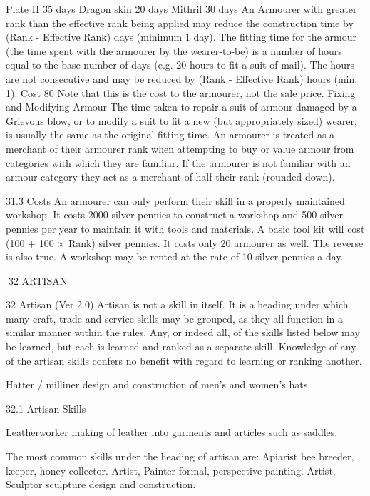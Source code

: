 \documentclass[a4paper]{article}
\begin{document}
\begin{multicols}{3}
Plate II
35 days
Dragon skin
20 days
Mithril
30 days
An Armourer with greater rank than the effective
rank being applied may reduce the construction
time by (Rank - Effective Rank) days (minimum 1
day).
The fitting time for the armour (the time spent with
the armourer by the wearer-to-be) is a number of
hours equal to the base number of days (e.g. 20
hours to fit a suit of mail). The hours are not consecutive and may be reduced by (Rank - Effective
Rank) hours (min. 1).
Cost 80%
Note that this is the cost to the armourer, not the
sale price.
Fixing and Modifying Armour
The time taken to repair a suit of armour damaged
by a Grievous blow, or to modify a suit to fit a new
(but appropriately sized) wearer, is usually the
same as the original fitting time.
An armourer is treated as a merchant of their
armourer rank when attempting to buy or value
armour from categories with which they are
familiar.
If the armourer is not familiar with an armour
category they act as a merchant of half their rank
(rounded down).

31.3 Costs
An armourer can only perform their skill in a
properly maintained workshop.
It costs 2000 silver pennies to construct a workshop and 500 silver pennies per year to maintain it
with tools and materials. A basic tool kit will cost
(100 + 100 × Rank) silver pennies. It costs only
20%
armourer as well. The reverse is also true. A workshop may be rented at the rate of 10 silver pennies
a day.

32 ARTISAN

32 Artisan (Ver 2.0)
Artisan is not a skill in itself. It is a heading under
which many craft, trade and service skills may be
grouped, as they all function in a similar manner
within the rules. Any, or indeed all, of the skills
listed below may be learned, but each is learned
and ranked as a separate skill. Knowledge of any of
the artisan skills confers no benefit with regard to
learning or ranking another.

Hatter / milliner design and construction of men’s
and women’s hats.

32.1 Artisan Skills

Leatherworker making of leather into garments
and articles such as saddles.

The most common skills under the heading of
artisan are:
Apiarist bee breeder, keeper, honey collector.
Artist, Painter formal, perspective painting.
Artist, Sculptor sculpture design and construction.


\end{multicols}
\end{document}
